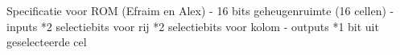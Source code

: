 Specificatie voor ROM (Efraim en Alex)
- 16 bits geheugenruimte (16 cellen)
- inputs
	*2 selectiebits voor rij
	*2 selectiebits voor kolom
- outputs
	*1 bit uit geselecteerde cel